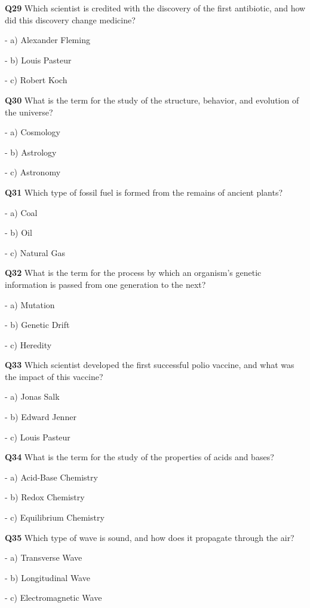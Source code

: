 \textbf{Q29} Which scientist is credited with the discovery of the first antibiotic, and how did this discovery change medicine?\par
\quad - a) Alexander Fleming\par
\quad - b) Louis Pasteur\par
\quad - c) Robert Koch\par

\textbf{Q30} What is the term for the study of the structure, behavior, and evolution of the universe?\par
\quad - a) Cosmology\par
\quad - b) Astrology\par
\quad - c) Astronomy\par

\textbf{Q31} Which type of fossil fuel is formed from the remains of ancient plants?\par
\quad - a) Coal\par
\quad - b) Oil\par
\quad - c) Natural Gas\par

\textbf{Q32} What is the term for the process by which an organism's genetic information is passed from one generation to the next?\par
\quad - a) Mutation\par
\quad - b) Genetic Drift\par
\quad - c) Heredity\par

\textbf{Q33} Which scientist developed the first successful polio vaccine, and what was the impact of this vaccine?\par
\quad - a) Jonas Salk\par
\quad - b) Edward Jenner\par
\quad - c) Louis Pasteur\par

\textbf{Q34} What is the term for the study of the properties of acids and bases?\par
\quad - a) Acid-Base Chemistry\par
\quad - b) Redox Chemistry\par
\quad - c) Equilibrium Chemistry\par

\textbf{Q35} Which type of wave is sound, and how does it propagate through the air?\par
\quad - a) Transverse Wave\par
\quad - b) Longitudinal Wave\par
\quad - c) Electromagnetic Wave\par

